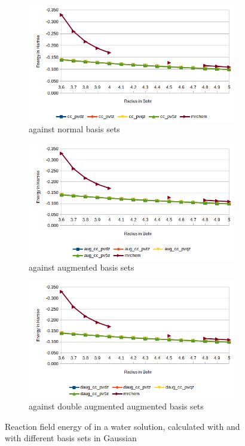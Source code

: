 \documentclass[../Thesis.tex]{subfiles}
\begin{document}
\begin{figure}[h!]
  \centering
  \begin{subfigure}[b]{0.75\linewidth}
    \includegraphics[width=\linewidth]{img/Ernop.png}
    \caption{\mrchem against normal basis sets}
  \end{subfigure}
  \begin{subfigure}[b]{0.75\linewidth}
    \includegraphics[width=\linewidth]{img/Eraugnop.png}
    \caption{\mrchem against augmented basis sets}
  \end{subfigure}
  \begin{subfigure}[b]{0.75\linewidth}
    \includegraphics[width=\linewidth]{img/Erdaugnop.png}
    \caption{\mrchem against double augmented augmented basis sets}
  \end{subfigure}
  \caption[Energy plots for ]{Reaction field energy of  in a water solution, calculated with \mrchem
  and with different basis sets in Gaussian}
  \label{fig:nopEnergyplots}

\end{figure}
\end{document}
